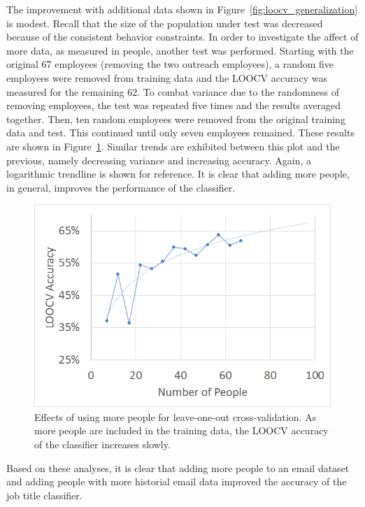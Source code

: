 \documentclass[12pt]{report}
\begin{document}
The improvement with additional data shown in Figure~\ref{fig:loocv_generalization} is modest.
Recall that the size of the population under test was decreased because of the consistent behavior constraints.
In order to investigate the affect of more data, as measured in people, another test was performed.
Starting with the original 67 employees (removing the two outreach employees), a random five employees were removed from training data and the LOOCV accuracy was measured for the remaining 62.
To combat variance due to the randomness of removing employees, the test was repeated five times and the results averaged together.
Then, ten random employees were removed from the original training data and test.
This continued until only seven employees remained.
These results are shown in Figure~\ref{fig:people_generalization}.
Similar trends are exhibited between this plot and the previous, namely decreasing variance and increasing accuracy.
Again, a logarithmic trendline is shown for reference.
It is clear that adding more people, in general, improves the performance of the classifier.
\begin{figure}[t]
    \centering
        \includegraphics[width=.7\columnwidth,trim={0mm 0mm 0mm 0mm},clip]{Num_of_people_LOOCV}
        \vspace{-7pt}
        \caption[Effects of more people on prediction accuracy]{Effects of using more people for leave-one-out cross-validation.  As more people are included in the training data, the LOOCV accuracy of the classifier increases slowly.}
        \label{fig:people_generalization}
\end{figure}

Based on these analyses, it is clear that adding more people to an email dataset and adding people with more historial email data improved the accuracy of the job title classifier.
\end{document}
